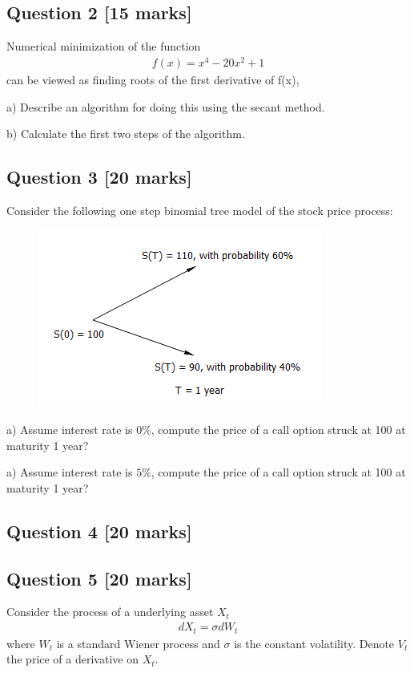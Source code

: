 \documentclass[11pt,a4paper,hidelinks,fleqn]{article}            %
\begin{document}
\subsection*{Question 2 [15 marks]}
Numerical minimization of the function
\begin{align*}
f(x) = x^4 - 20 x^2 + 1
\end{align*}
can be viewed as finding roots of the first derivative of f(x),

a) Describe an algorithm for doing this using the secant method.

b) Calculate the first two steps of the algorithm.


\subsection*{Question 3 [20 marks]}
Consider the following one step binomial tree model of the stock price process:
\begin{figure}[h]
\includegraphics[scale=0.9]{./4}
\end{figure}

a) Assume interest rate is $0\%$, compute the price of a call option struck at 100 at maturity 1 year?

a) Assume interest rate is $5\%$, compute the price of a call option struck at 100 at maturity 1 year?


\subsection*{Question 4 [20 marks]} 



\subsection*{Question 5 [20 marks]}
Consider the process of a underlying asset $X_t$
\begin{align*}
dX_t = \sigma dW_t
\end{align*}
where $W_t$ is a standard Wiener process and $\sigma$ is the constant volatility.
Denote $V_t$ the price of a derivative on $X_t$. 
\end{document}
